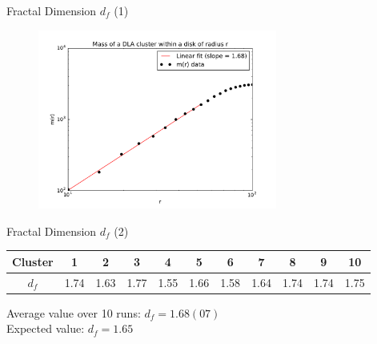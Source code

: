 \documentclass{beamer}
\begin{document}
\begin{frame}{Fractal Dimension $d_f$ (1)}

\begin{figure}[H]
	\centering
	\includegraphics[width=0.7\textwidth]{mass_vs_R.pdf}
\end{figure}

\end{frame}

\begin{frame}{Fractal Dimension $d_f$ (2)}


\begin{center}
\small
\begin{tabular}{ |c|c|c|c|c|c|c|c|c|c|c| } 
 \hline
Cluster & 1 & 2 & 3 & 4 & 5 & 6 & 7 & 8 & 9 & 10 \\ 
\hline
 $d_f$& 1.74 & 1.63 & 1.77 & 1.55 & 1.66 & 1.58 & 1.64 & 1.74 & 1.74 & 1.75 \\ 
 \hline
\end{tabular}
\end{center}

Average value over 10 runs: $d_f = 1.68(07)$\\
Expected value: $d_f  = 1.65$

\end{frame}




\end{document}
